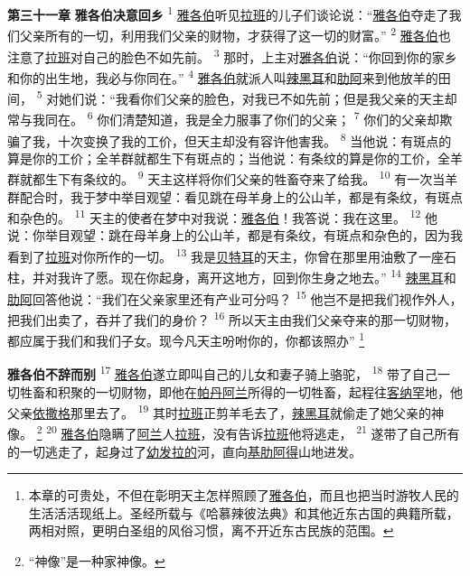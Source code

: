 \textbf{第三十一章 }
\textbf{雅各伯决意回乡 }
\textsuperscript{1}
\uline{雅各伯}听见\uline{拉班}的儿子们谈论说：“\uline{雅各伯}夺走了我们父亲所有的一切，利用我们父亲的财物，才获得了这一切的财富。”
\textsuperscript{2}
\uline{雅各伯}也注意了\uline{拉班}对自己的脸色不如先前。
\textsuperscript{3}
那时，上主对\uline{雅各伯}说：“你回到你的家乡和你的出生地，我必与你同在。”
\textsuperscript{4}
\uline{雅各伯}就派人叫\uline{辣黑耳}和\uline{肋阿}来到他放羊的田间，
\textsuperscript{5}
对她们说：“我看你们父亲的脸色，对我已不如先前；但是我父亲的天主却常与我同在。
\textsuperscript{6}
你们清楚知道，我是全力服事了你们的父亲；
\textsuperscript{7}
你们的父亲却欺骗了我，十次变换了我的工价，但天主却没有容许他害我。
\textsuperscript{8}
当他说：有斑点的算是你的工价；全羊群就都生下有斑点的；当他说：有条纹的算是你的工价，全羊群就都生下有条纹的。
\textsuperscript{9}
天主这样将你们父亲的牲畜夺来了给我。
\textsuperscript{10}
有一次当羊群配合时，我于梦中举目观望：看见跳在母羊身上的公山羊，都是有条纹，有斑点和杂色的。
\textsuperscript{11}
天主的使者在梦中对我说：\uline{雅各伯}！我答说：我在这里。
\textsuperscript{12}
他说：你举目观望：跳在母羊身上的公山羊，都是有条纹，有斑点和杂色的，因为我看到了\uline{拉班}对你所作的一切。
\textsuperscript{13}
我是\uline{贝特耳}的天主，你曾在那里用油敷了一座石柱，并对我许了愿。现在你起身，离开这地方，回到你生身之地去。”
\textsuperscript{14}
\uline{辣黑耳}和\uline{肋阿}回答他说：“我们在父亲家里还有产业可分吗？
\textsuperscript{15}
他岂不是把我们视作外人，把我们出卖了，吞并了我们的身价？
\textsuperscript{16}
所以天主由我们父亲夺来的那一切财物，都应属于我们和我们子女。现今凡天主吩咐你的，你都该照办”
\footnote{本章的可贵处，不但在彰明天主怎样照顾了\uline{雅各伯}，而且也把当时游牧人民的生活活活现纸上。圣经所载与《哈慕辣彼法典》和其他近东古国的典籍所载，两相对照，更明白圣组的风俗习惯，离不开近东古民族的范围。}

\textbf{雅各伯不辞而别 }
\textsuperscript{17}
\uline{雅各伯}遂立即叫自己的儿女和妻子骑上骆驼，
\textsuperscript{18}
带了自己一切牲畜和积聚的一切财物，即他在\uline{帕丹}\uline{阿兰}所得的一切牲畜，起程往\uline{客纳罕}地，他父亲\uline{依撒格}那里去了。
\textsuperscript{19}
其时\uline{拉班}正剪羊毛去了，\uline{辣黑耳}就偷走了她父亲的神像。
\footnote{“神像”是一种家神像。}
\textsuperscript{20}
\uline{雅各伯}隐瞒了\uline{阿兰}人\uline{拉班}，没有告诉\uline{拉班}他将逃走，
\textsuperscript{21}
遂带了自己所有的一切逃走了，起身过了\uline{幼发}\uline{拉的}河，直向\uline{基肋}\uline{阿得}山地进发。


